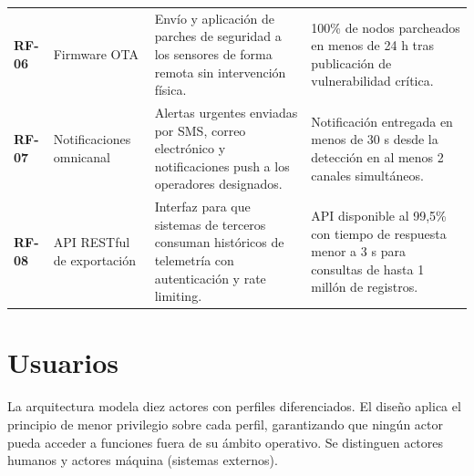 \documentclass[12pt, letterpaper]{article}
\begin{document}
\begin{longtable}{
  C{1.5cm}
  P{2.8cm}
  P{4.8cm}
  P{4.6cm}
}
\textbf{RF-06} & Firmware OTA &
  Envío y aplicación de parches de seguridad a los sensores de forma remota sin intervención
  física. &
  100\% de nodos parcheados en menos de 24 h tras publicación de vulnerabilidad crítica. \\

\textbf{RF-07} & Notificaciones omnicanal &
  Alertas urgentes enviadas por SMS, correo electrónico y notificaciones push a los operadores
  designados. &
  Notificación entregada en menos de 30 s desde la detección en al menos 2 canales
  simultáneos. \\

\textbf{RF-08} & API RESTful de exportación &
  Interfaz para que sistemas de terceros consuman históricos de telemetría con autenticación
  y rate limiting. &
  API disponible al 99,5\% con tiempo de respuesta menor a 3 s para consultas de hasta
  1 millón de registros. \\

\end{longtable}
\section{Usuarios}

La arquitectura modela diez actores con perfiles diferenciados. El diseño aplica el principio
de menor privilegio sobre cada perfil, garantizando que ningún actor pueda acceder a
funciones fuera de su ámbito operativo. Se distinguen actores humanos y actores máquina
(sistemas externos).
\end{document}
